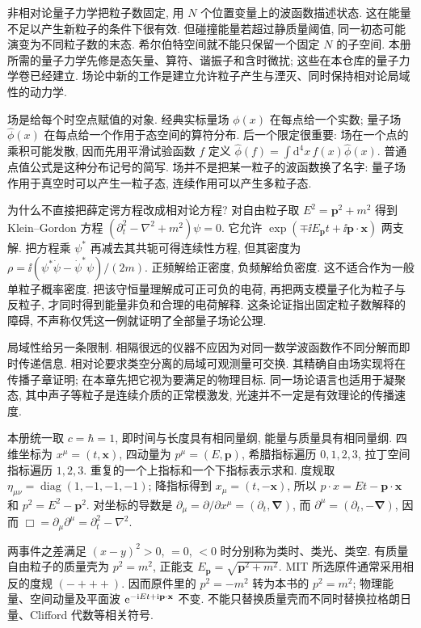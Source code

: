 \label{ch:qft-prerequisites}
非相对论量子力学把粒子数固定, 用 $N$ 个位置变量上的波函数描述状态. 这在能量不足以产生新粒子的条件下很有效. 但碰撞能量若超过静质量阈值, 同一初态可能演变为不同粒子数的末态. 希尔伯特空间就不能只保留一个固定 $N$ 的子空间. 本册所需的量子力学先修是态矢量、算符、谐振子和含时微扰; 这些在本仓库的量子力学卷已经建立. 场论中新的工作是建立允许粒子产生与湮灭、同时保持相对论局域性的动力学.

场是给每个时空点赋值的对象. 经典实标量场 $\phi(x)$ 在每点给一个实数; 量子场 $\hat\phi(x)$ 在每点给一个作用于态空间的算符分布. 后一个限定很重要: 场在一个点的乘积可能发散, 因而先用平滑试验函数 $f$ 定义 $\hat\phi(f)=\int \mathrm d^4x\,f(x)\hat\phi(x)$. 普通点值公式是这种分布记号的简写. 场并不是把某一粒子的波函数换了名字: 量子场作用于真空时可以产生一粒子态, 连续作用可以产生多粒子态.

为什么不直接把薛定谔方程改成相对论方程? 对自由粒子取 $E^2=\mathbf p^2+m^2$ 得到 Klein--Gordon 方程 $(\partial_t^2-\nabla^2+m^2)\psi=0$. 它允许 $\exp(\mp\ii E_{\mathbf p}t+\ii\mathbf p\cdot\mathbf x)$ 两支解. 把方程乘 $\psi^*$ 再减去其共轭可得连续性方程, 但其密度为 $\rho=\ii(\psi^*\dot\psi-\dot\psi^*\psi)/(2m)$. 正频解给正密度, 负频解给负密度. 这不适合作为一般单粒子概率密度. 把该守恒量理解成可正可负的电荷, 再把两支模量子化为粒子与反粒子, 才同时得到能量非负和合理的电荷解释. 这条论证指出固定粒子数解释的障碍, 不声称仅凭这一例就证明了全部量子场论公理.

局域性给另一条限制. 相隔很远的仪器不应因为对同一数学波函数作不同分解而即时传递信息. 相对论要求类空分离的局域可观测量可交换. 其精确自由场实现将在传播子章证明; 在本章先把它视为要满足的物理目标. 同一场论语言也适用于凝聚态, 其中声子等粒子是连续介质的正常模激发, 光速并不一定是有效理论的传播速度.

本册统一取 $c=\hbar=1$, 即时间与长度具有相同量纲, 能量与质量具有相同量纲. 四维坐标为 $x^\mu=(t,\mathbf x)$, 四动量为 $p^\mu=(E,\mathbf p)$, 希腊指标遍历 $0,1,2,3$, 拉丁空间指标遍历 $1,2,3$. 重复的一个上指标和一个下指标表示求和. 度规取 $\eta_{\mu\nu}=\operatorname{diag}(1,-1,-1,-1)$; 降指标得到 $x_\mu=(t,-\mathbf x)$, 所以 $p\cdot x=Et-\mathbf p\cdot\mathbf x$ 和 $p^2=E^2-\mathbf p^2$. 对坐标的导数是 $\partial_\mu=\partial/\partial x^\mu=(\partial_t,\boldsymbol\nabla)$, 而 $\partial^\mu=(\partial_t,-\boldsymbol\nabla)$, 因而 $\Box=\partial_\mu\partial^\mu=\partial_t^2-\nabla^2$.

两事件之差满足 $(x-y)^2>0$, $=0$, $<0$ 时分别称为类时、类光、类空. 有质量自由粒子的质量壳为 $p^2=m^2$, 正能支 $E_{\mathbf p}=\sqrt{\mathbf p^2+m^2}$. MIT 所选原件通常采用相反的度规 $(-+++)$. 因而原件里的 $p^2=-m^2$ 转为本书的 $p^2=m^2$; 物理能量、空间动量及平面波 $\mathrm e^{-\mathrm i Et+\mathrm i\mathbf p\cdot\mathbf x}$ 不变. 不能只替换质量壳而不同时替换拉格朗日量、Clifford 代数等相关符号.


